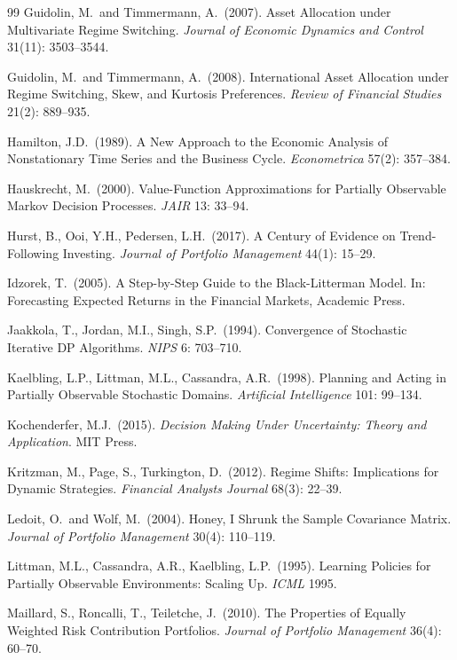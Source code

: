 \documentclass[11pt]{article}
\theoremstyle{plain1}
\theoremstyle{definition1}
\newcommand{\1}{\mathbf{1}}
\begin{document}
\begin{thebibliography}{99}
 Guidolin, M.\ and Timmermann, A.\ (2007). Asset Allocation under Multivariate Regime Switching. \emph{Journal of Economic Dynamics and Control} 31(11): 3503--3544.

 Guidolin, M.\ and Timmermann, A.\ (2008). International Asset Allocation under Regime Switching, Skew, and Kurtosis Preferences. \emph{Review of Financial Studies} 21(2): 889--935.

 Hamilton, J.D.\ (1989). A New Approach to the Economic Analysis of Nonstationary Time Series and the Business Cycle. \emph{Econometrica} 57(2): 357--384.

 Hauskrecht, M.\ (2000). Value-Function Approximations for Partially Observable Markov Decision Processes. \emph{JAIR} 13: 33--94.

 Hurst, B., Ooi, Y.H., Pedersen, L.H.\ (2017). A Century of Evidence on Trend-Following Investing. \emph{Journal of Portfolio Management} 44(1): 15--29.

 Idzorek, T.\ (2005). A Step-by-Step Guide to the Black-Litterman Model. In: Forecasting Expected Returns in the Financial Markets, Academic Press.

 Jaakkola, T., Jordan, M.I., Singh, S.P.\ (1994). Convergence of Stochastic Iterative DP Algorithms. \emph{NIPS} 6: 703--710.

 Kaelbling, L.P., Littman, M.L., Cassandra, A.R.\ (1998). Planning and Acting in Partially Observable Stochastic Domains. \emph{Artificial Intelligence} 101: 99--134.

 Kochenderfer, M.J.\ (2015). \emph{Decision Making Under Uncertainty: Theory and Application}. MIT Press.

 Kritzman, M., Page, S., Turkington, D.\ (2012). Regime Shifts: Implications for Dynamic Strategies. \emph{Financial Analysts Journal} 68(3): 22--39.

 Ledoit, O.\ and Wolf, M.\ (2004). Honey, I Shrunk the Sample Covariance Matrix. \emph{Journal of Portfolio Management} 30(4): 110--119.

 Littman, M.L., Cassandra, A.R., Kaelbling, L.P.\ (1995). Learning Policies for Partially Observable Environments: Scaling Up. \emph{ICML} 1995.

 Maillard, S., Roncalli, T., Teiletche, J.\ (2010). The Properties of Equally Weighted Risk Contribution Portfolios. \emph{Journal of Portfolio Management} 36(4): 60--70.


\end{thebibliography}
\end{document}
